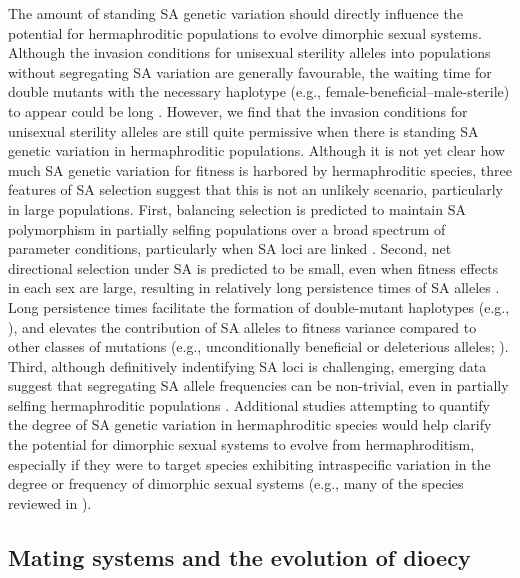 \documentclass{article}
\begin{document}
The amount of standing SA genetic variation should directly influence the potential for hermaphroditic populations to evolve dimorphic sexual systems. Although the invasion conditions for unisexual sterility alleles into populations without segregating SA variation are generally favourable, the waiting time for double mutants with the necessary haplotype (e.g., female-beneficial--male-sterile) to appear could be long \citep{WeinreichChao2005,ConnallonClark2010}. However, we find that the invasion conditions for unisexual sterility alleles are still quite permissive when there is standing SA genetic variation in hermaphroditic populations. Although it is not yet clear how much SA genetic variation for fitness is harbored by hermaphroditic species, three features of SA selection suggest that this is not an unlikely scenario, particularly in large populations. First, balancing selection is predicted to maintain SA polymorphism in partially selfing populations over a broad spectrum of parameter conditions, particularly when SA loci are linked \citep{Patten2010,JordanConnallon2014,Olito2016}. Second, net directional selection under SA is predicted to be small, even when fitness effects in each sex are large, resulting in relatively long persistence times of SA alleles \citep{ConnallonClark2012}. Long persistence times facilitate the formation of double-mutant haplotypes (e.g., \citealt{WeinreichChao2005}), and elevates the contribution of SA alleles to fitness variance compared to other classes of mutations (e.g., unconditionally beneficial or deleterious alleles; \citealt{ConnallonClark2012}). Third, although definitively indentifying SA loci is challenging, emerging data suggest that segregating SA allele frequencies can be non-trivial, even in partially selfing hermaphroditic populations \citep{Barson2015,LeeKelly2015}. Additional studies attempting to quantify the degree of SA genetic variation in hermaphroditic species would help clarify the potential for dimorphic sexual systems to evolve from hermaphroditism, especially if they were to target species exhibiting intraspecific variation in the degree or frequency of dimorphic sexual systems (e.g., many of the species reviewed in \citealt{SakaiWeller1999,Barrett2010,Renner2014}).


\subsection*{Mating systems and the evolution of dioecy}
\end{document}

